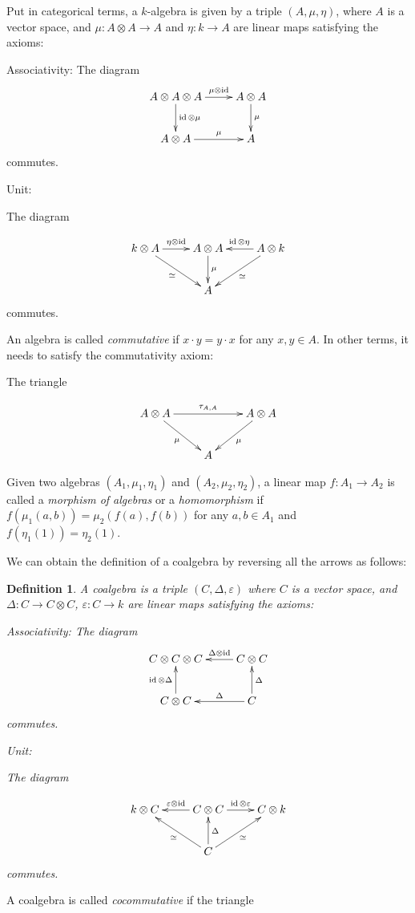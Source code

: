 \documentclass[]{article}
\newtheorem{defn}[theorem]{Definition}
\newcommand{\id}{\operatorname{id}}
\numberwithin{equation}{subsection}
\begin{document}
Put in categorical terms, a $k$-algebra is given by a triple $(A, \mu, \eta)$,
where $A$ is a vector space, and $\mu: A \otimes A \to A$ and $\eta: k \to A$
are linear maps satisfying the axioms:

Associativity:
The diagram
\begin{equation}
\xymatrix{
A \otimes A \otimes A \ar[d]^-{\id \otimes \mu} \ar[r]^-{\mu \otimes \id} & A \otimes A \ar[d]^-{\mu}\\
 A \otimes A \ar[r]^-\mu & A 
}
\end{equation}
commutes.

Unit: 

The diagram

\begin{equation}
    \xymatrix{
    k \otimes A \ar[r]^-{\eta \otimes \id} \ar[rd]_\simeq & A \otimes A \ar[d]^-\mu & A \otimes k \ar[l]_{\id \otimes \eta} \ar[ld]^-{\simeq} \\
    & A &
    }
\end{equation}
commutes.

An algebra is called \emph{commutative} if $x \cdot y = y \cdot x$ for any $x,y\in A$. In other terms, it needs to satisfy the commutativity axiom:

The triangle 

\begin{equation}
    \xymatrix{
    A \otimes A \ar[rr]^-{\tau_{A,A}} \ar[rd]_\mu & & A \otimes A \ar[ld]^-\mu \\
    & A &
    }
\end{equation}

Given two algebras $(A_1, \mu_1, \eta_1)$ and $(A_2, \mu_2, \eta_2)$, a linear
map $f: A_1 \to A_2$ is called a \emph{morphism of algebras} or a
\emph{homomorphism} if $f(\mu_1(a,b)) = \mu_2(f(a), f(b))$ for any $a,b\in A_1$ and $f(\eta_1(1)) = \eta_2(1)$.


We can obtain the definition of a coalgebra by reversing all the arrows as follows:

\begin{defn}
    A \emph{coalgebra} is a triple $(C, \Delta, \varepsilon)$ where $C$ is a
    vector space, and $\Delta: C \to C \otimes C$, $\varepsilon: C \to k$ are
    linear maps satisfying the axioms:

Associativity:
The diagram
\begin{equation}
\xymatrix{
C \otimes C \otimes C   & C \otimes C \ar[l]_-{\Delta \otimes \id}\\
 C \otimes C\ar[u]^-{\id \otimes \Delta}  & C \ar[l]_-\Delta \ar[u]_-{\Delta}
}
\end{equation}
commutes.

Unit: 

The diagram

\begin{equation}
    \xymatrix{
    k \otimes C  & C \otimes C \ar[l]_-{\varepsilon \otimes \id} \ar[r]^-{\id \otimes \varepsilon} & C \otimes k   \\
    & C \ar[u]_-\Delta \ar[lu]^-\simeq \ar[ru]_-{\simeq}&
    }
\end{equation}
commutes.
\end{defn}
A coalgebra is called \emph{cocommutative} if the triangle 
\end{document}

